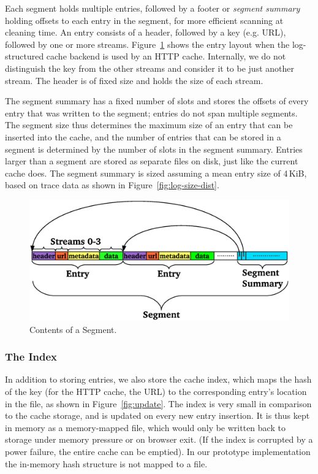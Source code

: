 \documentclass[letterpaper,twocolumn,10pt]{article}
\begin{document}
Each segment holds multiple entries, followed by a footer or \emph{segment
  summary} holding offsets to each entry in the segment, for more efficient
scanning at cleaning time.  An entry consists of a header, followed by a key
(e.g. URL), followed by one or more streams. Figure~\ref{fig:segment} shows the
entry layout when the log-structured cache backend is used by an HTTP cache.
Internally, we do not distinguish the key from the other streams and consider it
to be just another stream.  The header is of fixed size and holds the size of
each stream.

The segment summary has a fixed number of slots and stores the offsets of every
entry that was written to the segment; entries do not span multiple segments.
The segment size thus determines the maximum size of an entry that can be
inserted into the cache, and the number of entries that can be stored in a
segment is determined by the number of slots in the segment summary.  Entries
larger than a segment are stored as separate files on disk, just like the
current cache does.  The segment summary is sized assuming a mean entry size of
4\,KiB, based on trace data as shown in Figure~\ref{fig:log-size-dist}.

\begin{figure}[t]
  \begin{center}
    \includegraphics[width=1.04\columnwidth]{graphs/segment}
  \end{center}
  \caption{Contents of a Segment.}
  \label{fig:segment} 
\end{figure}

\subsubsection{The Index}
In addition to storing entries, we also store the cache index, which maps the
hash of the key (for the HTTP cache, the URL) to the corresponding entry's
location in the file, as shown in Figure~\ref{fig:update}.  The index is very
small in comparison to the cache storage, and is updated on every new entry
insertion.  It is thus kept in memory as a memory-mapped file, which would only
be written back to storage under memory pressure or on browser exit. (If the
index is corrupted by a power failure, the entire cache can be emptied).  In our
prototype implementation the in-memory hash structure is not mapped to a file.
\end{document}
